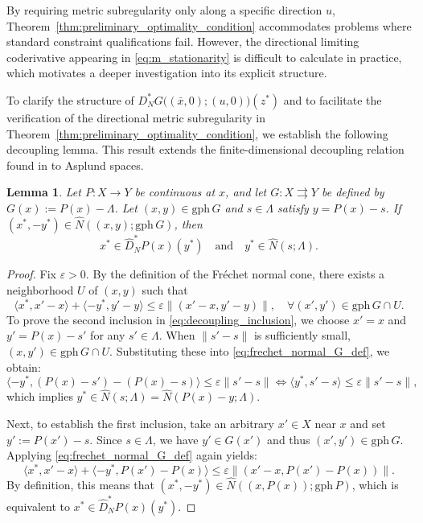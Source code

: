 \documentclass[12pt,twoside,reqno]{amsart}
\newtheorem{lemma}[theorem]{Lemma}
\theoremstyle{definition}
\numberwithin{equation}{section}
\begin{document}
By requiring metric subregularity only along a specific direction $u$, Theorem~\ref{thm:preliminary_optimality_condition} accommodates problems where standard constraint qualifications fail. However, the directional limiting coderivative appearing in \eqref{eq:m_stationarity} is difficult to calculate in practice, which motivates a deeper investigation into its explicit structure. 

To clarify the structure of $D_N^* G\big((\bar{x}, 0); (u, 0)\big)(z^*)$ and to facilitate the verification of the directional metric subregularity in Theorem~\ref{thm:preliminary_optimality_condition}, we establish the following decoupling lemma. This result extends the finite-dimensional decoupling relation found in \cite[Lemma~3.2]{bai2019directional} to Asplund spaces.

\begin{lemma} \label{lem:normal_cone_G_representation}
Let $P:X\to Y$ be continuous at $x$, and let $G: X \rightrightarrows Y$ be defined by $G(x) := P(x) - \Lambda$. Let $(x, y) \in \mathrm{gph}\, G$ and $s \in \Lambda$ satisfy $y = P(x) - s$. If $(x^*, -y^*) \in \widehat{N}\left((x, y); \mathrm{gph}\, G\right)$, then
\begin{equation} \label{eq:decoupling_inclusion}
    x^* \in \widehat{D}_N^* P(x)(y^*) \quad \text{and} \quad y^* \in \widehat{N}(s; \Lambda).
\end{equation}
\end{lemma}

\begin{proof}
Fix $\varepsilon>0$. By the definition of the Fr\'echet normal cone, there exists a neighborhood $U$ of $(x,y)$ such that
\begin{equation} \label{eq:frechet_normal_G_def}
    \langle x^*, x' - x \rangle + \langle -y^*, y' - y \rangle \leq \varepsilon \|(x' - x, y' - y)\|, \quad \forall (x', y') \in \mathrm{gph}\, G \cap U.
\end{equation}
To prove the second inclusion in \eqref{eq:decoupling_inclusion}, we choose $x' = x$ and $y' = P(x) - s'$ for any $s' \in \Lambda$. When $\|s' - s\|$ is sufficiently small, $(x, y') \in \mathrm{gph}\, G \cap U$. Substituting these into \eqref{eq:frechet_normal_G_def}, we obtain:
\begin{equation*}
    \langle -y^*, (P(x) - s') - (P(x) - s) \rangle \leq \varepsilon \|s' - s\| \iff \langle y^*, s' - s \rangle \leq \varepsilon \|s' - s\|,
\end{equation*}
which implies $y^* \in \widehat{N}(s; \Lambda) = \widehat{N}(P(x) - y; \Lambda)$.

Next, to establish the first inclusion, take an arbitrary $x' \in X$ near $x$ and set $y' := P(x') - s$. Since $s \in \Lambda$, we have $y' \in G(x')$ and thus $(x', y') \in \mathrm{gph}\, G$. Applying \eqref{eq:frechet_normal_G_def} again yields:
\begin{equation*}
    \langle x^*, x' - x \rangle + \langle -y^*, P(x') - P(x) \rangle \leq \varepsilon \|(x' - x, P(x') - P(x))\|.
\end{equation*}
By definition, this means that $(x^*, -y^*) \in \widehat{N}((x, P(x)); \mathrm{gph}\, P)$, which is equivalent to $x^* \in \widehat{D}_N^* P(x)(y^*)$.
\end{proof}
\end{document}
